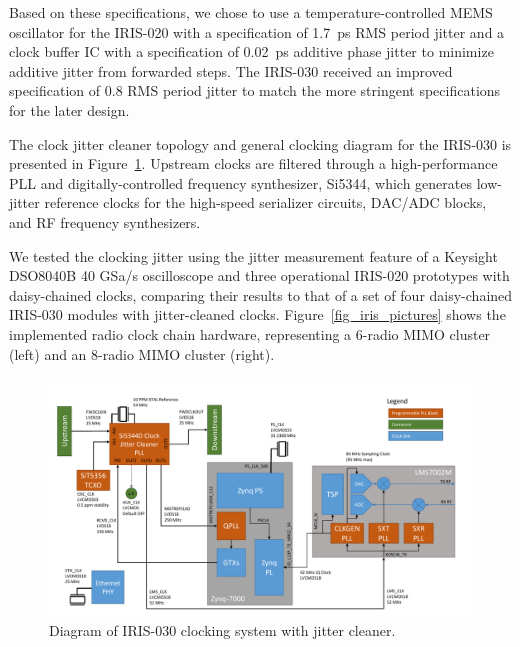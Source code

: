 	Based on these specifications, we chose to use a temperature-controlled MEMS oscillator for the IRIS-020 with a specification of 1.7~ps \ac{RMS} period jitter and a clock buffer IC with a specification of 0.02~ps additive phase jitter to minimize additive jitter from forwarded steps.
	The IRIS-030 received an improved specification of 0.8 \ac{RMS} period jitter to match the more stringent specifications for the later design.
	
	The clock jitter cleaner topology and general clocking diagram for the IRIS-030 is presented in Figure~\ref{fig_030_clk_diagram}.
Upstream clocks are filtered through a high-performance \ac{PLL} and digitally-controlled frequency synthesizer, Si5344, which generates low-jitter reference clocks for the high-speed serializer circuits, \ac{DAC}/\ac{ADC} blocks, and RF frequency synthesizers.

We tested the clocking jitter using the jitter measurement feature of a Keysight DSO8040B 40 GSa/s oscilloscope and three operational IRIS-020 prototypes with daisy-chained clocks, comparing their results to that of a set of four daisy-chained IRIS-030 modules with jitter-cleaned clocks.
Figure~\ref{fig_iris_pictures} shows the implemented radio clock chain hardware, representing a 6-radio \ac{MIMO} cluster (left) and an 8-radio \ac{MIMO} cluster (right).

\begin{figure}[p]
\centering
\includegraphics[width=1\textwidth]{figs/clk/iris_clocking_diagram}
\caption{Diagram of IRIS-030 clocking system with jitter cleaner.}
\label{fig_030_clk_diagram}
\end{figure}



